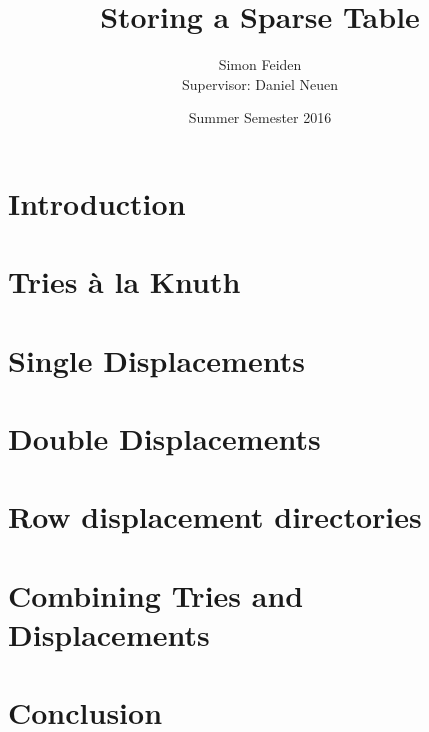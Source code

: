 \documentclass[12pt]{article}
\title{Storing a Sparse Table}
\date{Summer Semester 2016}
\author{Simon Feiden\\Supervisor: Daniel Neuen}
\begin{document}
\maketitle
\thispagestyle{empty}

\vspace*{2em}

\section*{Introduction}




\section*{Tries à la Knuth}




\section*{Single Displacements}




\section*{Double Displacements}




\section*{Row displacement directories}




\section*{Combining Tries and Displacements}



\section*{Conclusion}





\end{document}
